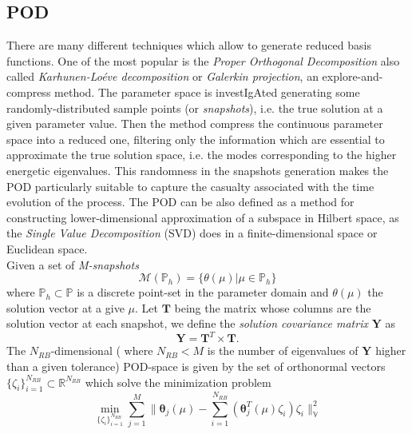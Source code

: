 \documentclass[3p]{article}
\begin{document}

\subsection*{POD}
There are many different techniques which allow to generate reduced basis functions. One of the most popular is the \textit{Proper Orthogonal Decomposition} also called \textit{Karhunen-Lo{\'e}ve decomposition} or \textit{Galerkin projection}, an explore-and-compress method. The parameter space is investIgAted generating some randomly-distributed sample points (or \textit{snapshots}), i.e. the true solution at a given parameter value. Then the method compress the continuous parameter space into a reduced one, filtering only the information which are essential to approximate the true solution space, i.e. the modes corresponding to the higher energetic eigenvalues. This randomness in the snapshots generation makes the POD particularly suitable to capture the casualty associated with the time evolution of the process. The POD can be also defined as a method for constructing lower-dimensional approximation of a subspace in Hilbert space, as the \textit{Single Value Decomposition} (SVD) does in a finite-dimensional space or Euclidean space.\\Given a set of \textit{M-snapshots} 
\begin{equation}
\mathcal{M}(\mathbb{P}_{h}) = \lbrace\theta(\mu)\vert\mu \in \mathbb{P}_{h}\rbrace
\end{equation}
where $\mathbb{P}_{h} \subset \mathbb{P}$ is a discrete point-set in the parameter domain and $\theta(\mu)$ the solution vector at a give $\mu$. Let $\mathbf{T}$ being the matrix whose columns are the solution vector at each snapshot, we define the \textit{solution covariance matrix} $\mathbf{Y}$ as
\begin{equation}
\mathbf{Y} = \mathbf{T}^{T} \times \mathbf{T}.
\label{eq:covarianceMatrix}
\end{equation}
The $N_{RB}$-dimensional ( where $N_{RB} < M$ is the number of eigenvalues of $\mathbf{Y}$ higher than a given tolerance) POD-space is given by the set of orthonormal vectors $\lbrace \zeta_{i} \rbrace_{i=1}^{N_{RB}} \subset \mathbb{R}^{N_{RB}}$ which solve the minimization problem \\
\indent
\begin{equation}
\min_{\lbrace\zeta_{i}\rbrace_{i=1}^{N_{RB}}}\sum_{j=1}^{M} 
\| \mathbold{\theta}_{j}(\mu) - \sum_{i=1}^{N_{RB}}(\mathbold{\theta}_{j}^{T}(\mu)\zeta_{i})\zeta_i\|_{\mathbb{V}}^{2}
\label{eq:minPOD}
\end{equation}
\end{document}
